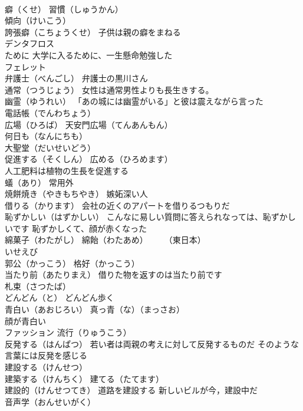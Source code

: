 \documentclass[8pt]{extreport}
\begin{document}
\begin{CJK}{UTF8}{min}
\\	癖（くせ） 習慣（しゅうかん）
\\	傾向（けいこう）
\\	誇張癖（こちょうくせ） 子供は親の癖をまねる
\\	デンタフロス
\\	ために 大学に入るために、一生懸命勉強した
\\	フェレット 
\\	弁護士（べんごし） 弁護士の黒川さん
\\	通常（つうじょう） 女性は通常男性よりも長生きする。
\\	幽霊（ゆうれい） 「あの城には幽霊がいる」と彼は震えながら言った
\\	電話帳（でんわちょう）
\\	広場（ひろば） 天安門広場（てんあんもん）
\\	何日も（なんにちも）
\\	大聖堂（だいせいどう）
\\	促進する（そくしん） 広める（ひろめます）
\\	人工肥料は植物の生長を促進する
\\	蟻（あり） 常用外
\\	焼餅焼き（やきもちやき） 嫉妬深い人
\\	借りる（かります） 会社の近くのアパートを借りるつもりだ
\\	恥ずかしい（はずかしい） こんなに易しい質問に答えられなっては、恥ずかしいです 恥ずかしくて、顔が赤くなった
\\	綿菓子（わたがし） 綿飴（わたあめ）　　　（東日本）
\\	いせえび
\\	郭公（かっこう） 格好（かっこう）　
\\	当たり前（あたりまえ） 借りた物を返すのは当たり前です
\\	札束（さつたば）
\\	どんどん（と） どんどん歩く
\\	青白い（あおじろい） 真っ青（な）（まっさお）
\\	顔が青白い
\\	ファッション 流行（りゅうこう）
\\	反発する（はんぱつ） 若い者は両親の考えに対して反発するものだ そのような言葉には反発を感じる
\\	建設する（けんせつ）
\\	建築する（けんちく） 建てる（たてます）
\\	建設的（けんせつてき） 道路を建設する 新しいビルが今，建設中だ
\\	音声学（おんせいがく）

\end{CJK}
\end{document}
